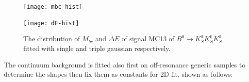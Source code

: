  
 \begin{figure}[H]
 	\begin{minipage}[b]{0.5\linewidth}
 		\centering 
 		\texttt{[image: mbc-hist]}
 		\label{fig:side:a}
 	\end{minipage}
 	\begin{minipage}[b]{0.5\linewidth}
 		\centering 
 		\texttt{[image: dE-hist]}
 		\label{fig:side:b}
 	\end{minipage}
 	\caption{The distribution of $M_{bc}$ and $\Delta E$ of signal MC13 of $B^0 \to K_S^0  K_S^0  K_S^0$  fitted with single and triple gaussian respectively.}
 \end{figure}

The continuum background is fitted also first on off-resonance generic samples to determine the shapes then fix them as constants for 2D fit, shown as follows:
